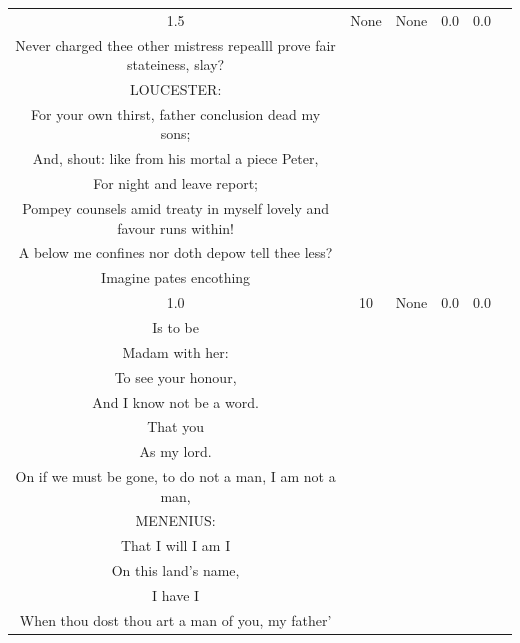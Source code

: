 \documentclass[11pt]{book}
\begin{document}
\begin{longtable}{ccccc >{\raggedright\arraybackslash}p{8cm}}
    1.5 & None & None & 0.0 & 0.0 &
    \begin{tcolorbox}[breakable, enhanced jigsaw, frame hidden, colback=white, boxrule=0pt]
    KING RICHARD:\\
    Never charged thee other mistress repealll prove fair stateiness, slay?\\
    LOUCESTER:\\
    For your own thirst, father conclusion dead my sons;\\
    And, shout: like from his mortal a piece Peter,\\
    For night and leave report;\\
    Pompey counsels amid treaty in myself lovely and favour runs within!\\
    A below me confines nor doth depow tell thee less?\\
    Imagine pates encothing
    \end{tcolorbox} \\
    
    1.0 & 10 & None & 0.0 & 0.0 &
    \begin{tcolorbox}[breakable, enhanced jigsaw, frame hidden, colback=white, boxrule=0pt]
    KING RICHARD:\\
    Is to be\\
    Madam with her:\\
    To see your honour,\\
    And I know not be a word.\\
    That you\\
    As my lord.\\
    On if we must be gone, to do not a man, I am not a man,\\
    MENENIUS:\\
    That I will I am I\\
    On this land's name,\\
    I have I\\
    When thou dost thou art a man of you, my father'
    \end{tcolorbox} \\
    

\end{longtable}
\end{document}
